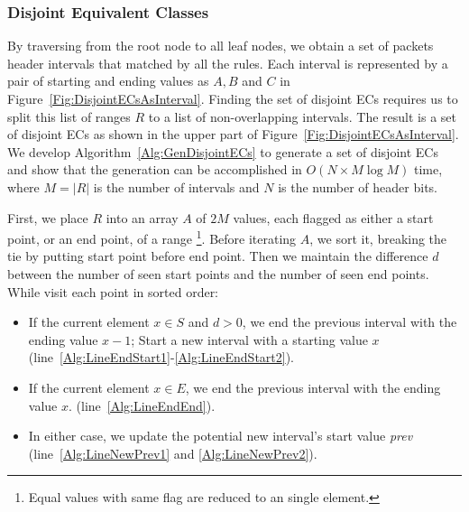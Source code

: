 \subsubsection{Disjoint Equivalent Classes}
By traversing from the root node to all leaf nodes, we obtain a set of packets header intervals that matched by all the rules. Each interval is represented by a pair of starting and ending values
as $A, B$ and $C$ in Figure~\ref{Fig:DisjointECsAsInterval}. Finding the set of disjoint ECs requires us to split this list of ranges $R$ to a list of non-overlapping intervals. The result is a set of disjoint ECs as shown in the upper part of Figure~\ref{Fig:DisjointECsAsInterval}. 
We develop Algorithm~\ref{Alg:GenDisjointECs} to generate a set of disjoint ECs and show that the generation can be accomplished in $O(N \times M\log M)$ time,
where $M=|R|$ is the number of intervals and $N$ is the number of header bits.

First, we place $R$ into an array $A$ of $2M$ values,
each flagged as either a start point, or an end point, of a range
\footnote{Equal values with same flag are reduced to an single element.}.
Before iterating $A$, we sort it, breaking the tie by putting start point before end point.
Then we maintain the difference $d$ between the number of seen start points and
the number of seen end points. While visit each point in sorted order:
\begin{itemize}
\item If the current element $x \in S$ and $d > 0$,
        we end the previous interval with the ending value $x - 1$;
        Start a new interval with a starting value $x$
        (line~\ref{Alg:LineEndStart1}-\ref{Alg:LineEndStart2}).
\item If the current element $x \in E$, we end the previous interval with the ending value $x$.
        (line~\ref{Alg:LineEndEnd}).
\item In either case, we update the potential new interval's start value \textit{prev}
        (line~\ref{Alg:LineNewPrev1} and \ref{Alg:LineNewPrev2}).
\end{itemize}

